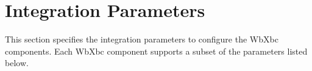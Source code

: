
\section{Integration Parameters}
\label{param}

This section specifies the integration parameters to configure the WbXbc components.
Each WbXbc component supports a subset of the parameters listed below.

